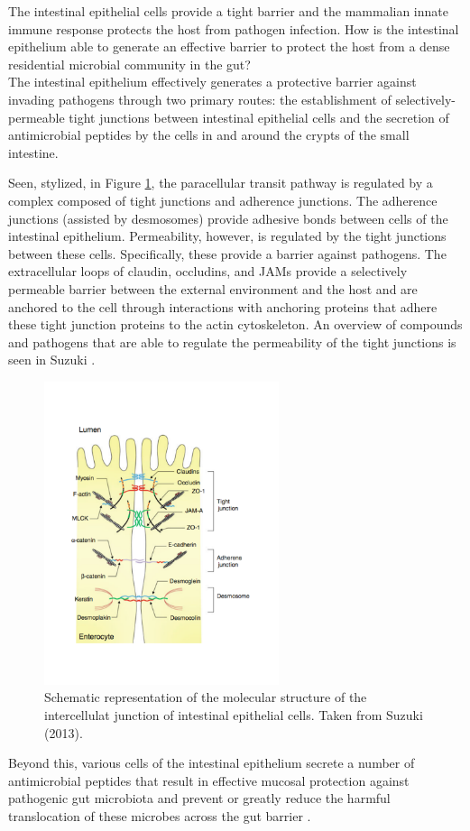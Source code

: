 \documentclass[11pt,letterpaper,final] {article}
\newenvironment{exercise}[2][Exercise]{\begin{trivlist}
	\item[\hskip \labelsep {\bfseries #1}\hskip \labelsep {\bfseries #2.}]}{\end{trivlist}}
\begin{document}
\begin{exercise}[Exercise]{2} The intestinal epithelial cells provide a tight barrier and the mammalian innate immune response protects the host from pathogen infection. How is the intestinal epithelium able to generate an effective barrier to protect the host from a dense residential microbial community in the gut?\\

The intestinal epithelium effectively generates a protective barrier against invading pathogens through two primary routes: the establishment of selectively-permeable tight junctions between intestinal epithelial cells and the secretion of antimicrobial peptides by the cells in and around the crypts of the small intestine.

Seen, stylized, in Figure \ref{fig:01}, the paracellular transit pathway is regulated by a complex composed of tight junctions and adherence junctions. The adherence junctions (assisted by desmosomes) provide adhesive bonds between cells of the intestinal epithelium. Permeability, however, is regulated by the tight junctions between these cells. Specifically,  these provide a barrier against pathogens. The extracellular loops of claudin, occludins, and JAMs provide a selectively permeable barrier between the external environment and the host and are anchored to the cell through interactions with anchoring proteins that adhere these tight junction proteins to the actin cytoskeleton. An overview of compounds and pathogens that are able to regulate the permeability of the tight junctions is seen in Suzuki \citeyear{Suzuki:2013}.

	\begin{figure}[htp]
	\centering
		\includegraphics[height=3.5in]{tj}
	\caption{Schematic representation of the molecular structure of the intercellulat junction of intestinal epithelial cells. Taken from Suzuki (2013).}
	\label{fig:01}
	\end{figure}

Beyond this, various cells of the intestinal epithelium secrete a number of antimicrobial peptides that result in effective mucosal protection against pathogenic gut microbiota and prevent or greatly reduce the harmful translocation of these microbes across the gut barrier \cite{Ostaff:2013}.
	
\end{exercise}
\end{document}
